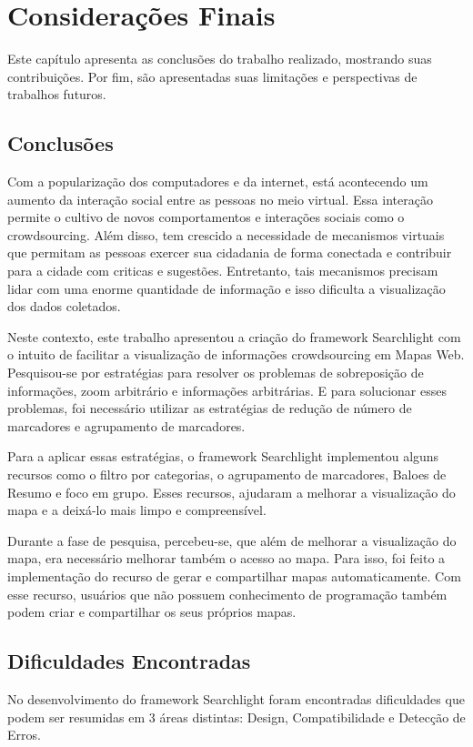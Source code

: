 \chapter{Considerações Finais}

Este capítulo apresenta as conclusões do trabalho realizado, mostrando suas contribuições. Por fim, são apresentadas suas limitações e perspectivas de trabalhos futuros.

\section{Conclusões}
Com a popularização dos computadores e da internet, está acontecendo um aumento da interação social entre as pessoas no meio virtual. Essa interação permite o cultivo de novos comportamentos e interações sociais como o crowdsourcing. Além disso, tem crescido a necessidade de mecanismos virtuais que permitam as pessoas exercer sua cidadania de forma conectada e contribuir para a cidade com  criticas e sugestões. Entretanto, tais mecanismos precisam lidar com uma enorme quantidade de informação e isso dificulta a visualização dos dados coletados.

Neste contexto, este trabalho apresentou a criação do framework Searchlight com o intuito de facilitar a visualização de informações crowdsourcing em Mapas Web. Pesquisou-se por estratégias para resolver os problemas de sobreposição de informações, zoom arbitrário e informações arbitrárias. E para solucionar esses problemas, foi necessário utilizar as estratégias de redução de número de marcadores e agrupamento de marcadores.

Para a aplicar essas estratégias, o framework Searchlight implementou alguns recursos como o filtro por categorias, o agrupamento de marcadores, Baloes de Resumo e foco em grupo. Esses recursos, ajudaram a melhorar a visualização do mapa e a deixá-lo mais limpo e compreensível.

Durante a fase de pesquisa, percebeu-se, que além de melhorar a visualização do mapa, era necessário  melhorar também o acesso ao mapa. Para isso, foi feito a implementação do recurso de gerar e compartilhar mapas automaticamente. Com esse recurso, usuários que não possuem conhecimento de programação também podem criar  e compartilhar os seus próprios mapas.

\section{Dificuldades Encontradas}
No desenvolvimento do framework Searchlight foram encontradas dificuldades que podem ser resumidas em 3 áreas distintas: Design, Compatibilidade e Detecção de Erros.

